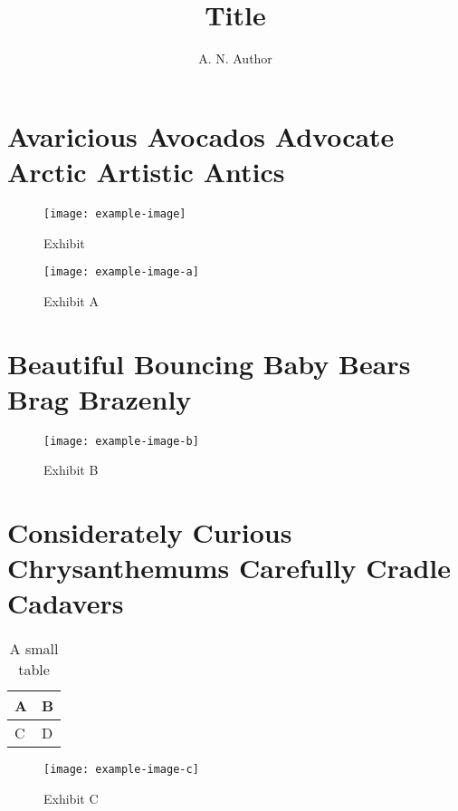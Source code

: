 \documentclass[british,a4paper]{article}
\begin{document}
\title{Title}
\author{A. N. Author}
\date{}
\maketitle

\section{Avaricious Avocados Advocate Arctic Artistic Antics}\label{sec:aaaaaa}

\begin{figure}
  \centering
  \texttt{[image: example-image]}
  \caption{Exhibit}\label{fig:e}
\end{figure}

\kant[1-2]

\begin{figure}
  \centering
  \texttt{[image: example-image-a]}
  \caption{Exhibit A}\label{fig:ea}
\end{figure}


\section{Beautiful Bouncing Baby Bears Brag Brazenly}\label{sec:bbbbbb}

\kant[3-4]

\begin{figure}
  \centering
  \texttt{[image: example-image-b]}
  \caption{Exhibit B}\label{fig:eb}
\end{figure}
\kant[5-6]

\section{Considerately Curious Chrysanthemums Carefully Cradle Cadavers}\label{sec:cccccc}

\kant[7]

\begin{table}
  \centering
  \caption{A small table}\label{tab:st1}
  \begin{tabular}{ll}
    \toprule
    A & B \\
    \midrule
    C & D \\
    \bottomrule
  \end{tabular}
\end{table}

\begin{figure}
  \centering
  \texttt{[image: example-image-c]}
  \caption{Exhibit C}\label{fig:ec}
\end{figure}
\end{document}
